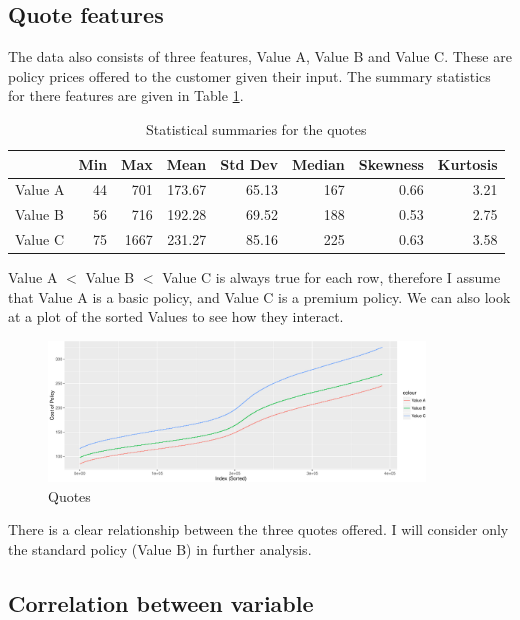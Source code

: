 \subsection{Quote features}
\label{quote-features}

The data also consists of three features, Value A, Value B and Value C. These are policy prices offered to the customer given their input. The
summary statistics for there features are given in Table \ref{tab:value_summaries}.


\begin{table}[h]
\begin{center}
 \begin{tabular}{lrrrrrrr}
& Min & Max & Mean & Std Dev & Median &
Skewness & Kurtosis \\
\hline
Value A & 44 & 701 & 173.67 & 65.13 & 167 & 0.66 & 3.21\\
Value B & 56 & 716 & 192.28 & 69.52 & 188 & 0.53 & 2.75\\
Value C & 75 & 1667 & 231.27 & 85.16 & 225 & 0.63 & 3.58\\
\end{tabular}
\caption{Statistical summaries for the quotes}
\label{tab:value_summaries}
\end{center}
\end{table}

Value A $<$ Value B $<$ Value C is always true for each row, therefore I assume that Value A is a basic policy, and Value C is a
premium policy. We can also look at a plot of the sorted Values to see how they interact.

\begin{figure}[h]
  \centering
 \includegraphics[width = 10cm]{exploration_files/figure-latex/values_sorted-1.pdf} 
  \caption{Quotes}
\end{figure}

There is a clear relationship between the three quotes offered. I will consider only the standard policy (Value B) in further analysis.

\subsection{Correlation between variable}

